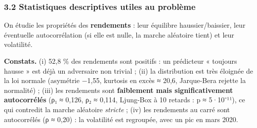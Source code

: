 \documentclass[
  10pt,
]{article}
\begin{document}
\hypertarget{statistiques-descriptives-utiles-au-probluxe8me}{%
\subsubsection{3.2 Statistiques descriptives utiles au
problème}\label{statistiques-descriptives-utiles-au-probluxe8me}}

On étudie les propriétés des \textbf{rendements} : leur équilibre
haussier/baissier, leur éventuelle autocorrélation (si elle est nulle,
la marche aléatoire tient) et leur volatilité.

\textbf{Constats.} (i) 52,8 \% des rendements sont positifs : un
prédicteur « toujours hausse » est déjà un adversaire non trivial ; (ii)
la distribution est très éloignée de la loi normale (asymétrie −1,55,
kurtosis en excès ≈ 20,6, Jarque-Bera rejette la normalité) ; (iii) les
rendements sont \textbf{faiblement mais significativement autocorrélés}
(ρ₁ ≈ 0,126, ρ₂ ≈ 0,114, Ljung-Box à 10 retards : p ≈ 5·10⁻¹¹), ce qui
contredit la marche aléatoire \emph{stricte} ; (iv) les rendements au
carré sont autocorrélés (ρ ≈ 0,20) : la volatilité est regroupée, avec
un pic en mars 2020.
\end{document}
